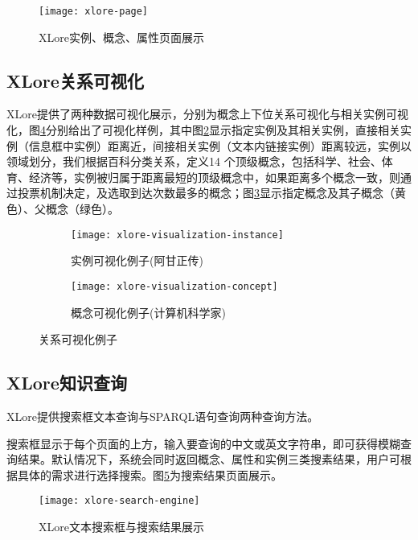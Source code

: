 \begin{figure}[ht]
  \centering
  \texttt{[image: xlore-page]}
  \caption{XLore实例、概念、属性页面展示}
  \label{fig:xlore-page}
\end{figure}

\subsection{XLore关系可视化}

XLore提供了两种数据可视化展示，分别为概念上下位关系可视化与相关实例可视化，图\ref{fig:xlore-visualization}分别给出了可视化样例，其中图\ref{fig:xlore-visualization-instance}显示指定实例及其相关实例，直接相关实例（信息框中实例）距离近，间接相关实例（文本内链接实例）距离较远，实例以领域划分，我们根据百科分类关系，定义14 个顶级概念，包括科学、社会、体育、经济等，实例被归属于距离最短的顶级概念中，如果距离多个概念一致，则通过投票机制决定，及选取到达次数最多的概念；图\ref{fig:xlore-visualization-concept}显示指定概念及其子概念（黄色）、父概念（绿色）。

\begin{figure}[ht]
  \centering
  \begin{subfigure}{7.2cm}
    \texttt{[image: xlore-visualization-instance]}
    \caption{实例可视化例子(阿甘正传)}
  \label{fig:xlore-visualization-instance}
  \end{subfigure}
  \hspace{0.01cm}%
  \begin{subfigure}{7.2cm}
    \texttt{[image: xlore-visualization-concept]}
    \caption{概念可视化例子(计算机科学家)}
  \label{fig:xlore-visualization-concept}
  \end{subfigure}
  \caption{关系可视化例子}
  \label{fig:xlore-visualization}
\end{figure}

\subsection{XLore知识查询}
XLore提供搜索框文本查询与SPARQL语句查询两种查询方法。

搜索框显示于每个页面的上方，输入要查询的中文或英文字符串，即可获得模糊查询结果。默认情况下，系统会同时返回概念、属性和实例三类搜素结果，用户可根据具体的需求进行选择搜索。图\ref{fig:xlore-search-engine}为搜索结果页面展示。

\begin{figure}[ht]
  \centering
  \texttt{[image: xlore-search-engine]}
  \caption{XLore文本搜索框与搜索结果展示}
  \label{fig:xlore-search-engine}
\end{figure}

